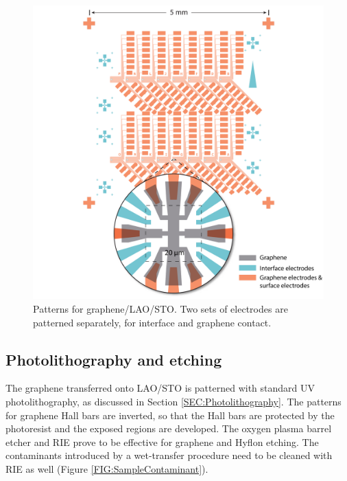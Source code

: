 \documentclass[pdflatex, sectionletters, 12pt]{pittetd}    %
\begin{document}
\begin{figure}[p]
	\centering
	\includegraphics[width=1\textwidth]{Drawing/GCO.pdf}
	\caption{Patterns for graphene/LAO/STO. Two sets of electrodes are patterned separately, for interface and graphene contact.}
	\label{FIG:GCO}
\end{figure}

\subsection{Photolithography and etching}

The graphene transferred onto LAO/STO is patterned with standard UV photolithography, as discussed in Section \ref{SEC:Photolithography}. The patterns for graphene Hall bars are inverted, so that the Hall bars are protected by the photoresist and the exposed regions are developed. The oxygen plasma barrel etcher and RIE prove to be effective for graphene and Hyflon etching. The contaminants introduced by a wet-transfer procedure need to be cleaned with RIE as well (Figure \ref{FIG:SampleContaminant}). 
\end{document}
